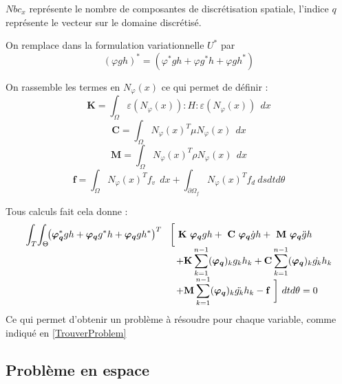 \documentclass[12pt,a4paper]{report}
\begin{document}
$Nbc_x$ représente le nombre de composantes de discrétisation spatiale, l'indice $q$ représente le vecteur sur le domaine discrétisé.

On remplace dans la formulation variationnelle $U^*$ par 
\[  (\varphi gh)^* = ( \varphi^*gh+\varphi g^*h+\varphi gh^*) \]

\noindent
On rassemble les termes en $N_\varphi(x)$ ce qui permet de définir :
\begin{equation}
\mathbf{K} = \int_\Omega \varepsilon (N_\varphi(x)) : H : \varepsilon (N_\varphi(x))~~dx
\end{equation}
\begin{equation}
\mathbf{C} = \int_\Omega N_\varphi(x)^T \mu  N_\varphi(x)~~dx
\end{equation}
\begin{equation}
\mathbf{M} = \int_\Omega N_\varphi(x)^T \rho  N_\varphi(x)~~dx
\end{equation}
\begin{equation}
\mathbf{f} = \int_\Omega N_\varphi(x)^T f_v ~~dx 
	+ \int_{\partial \Omega_f} N_\varphi(x)^T f_d ~ds dt d\theta
\end{equation}

\noindent
Tous calculs fait cela donne :
\begin{equation}
\begin{array}{l l}
	\displaystyle	
	\int_T \! \int_\Theta	\!\!
		\big(\boldsymbol{\varphi_q}^*gh + \boldsymbol{\varphi_q}g^*h + \boldsymbol{\varphi_q}gh^*\big)^T \!
				&	\bigg[~\mathbf{K}~ \boldsymbol{\varphi_q}gh
						+ ~\mathbf{C}~ \boldsymbol{\varphi_q} \dot{g}h 
						+ ~\mathbf{M}~ \boldsymbol{\varphi_q} \ddot{g}h
	\\ 
	  &~~\displaystyle
			+ \mathbf{K} \sum_{k=1}^{n-1} (\boldsymbol{\varphi_q})_k       g_k  h_k 
			+ \mathbf{C} \sum_{k=1}^{n-1} (\boldsymbol{\varphi_q})_k  \dot{g_k} h_k 
	\\ &~~\displaystyle
			+ \mathbf{M} \sum_{k=1}^{n-1} (\boldsymbol{\varphi_q})_k \ddot{g_k} h_k
			 -\mathbf{f}~\bigg] ~dt d\theta
	= 0
\end{array}
\label{TotalProblem}
\end{equation}
Ce qui permet d'obtenir un problème à résoudre pour chaque variable, comme indiqué en \ref{TrouverProblem}

\subsection{Problème en espace}
\end{document}
